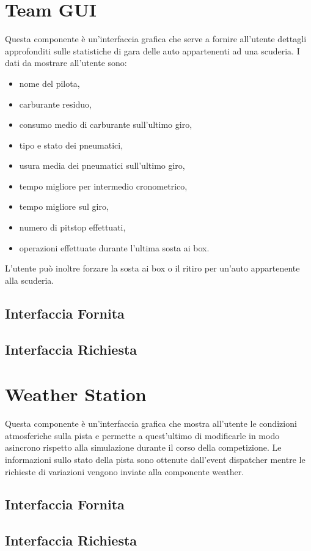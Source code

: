 \documentclass[11pt,a4paper]{report}
\begin{document}
\section{Team GUI}
Questa componente è un'interfaccia grafica che serve a fornire all'utente dettagli approfonditi sulle statistiche di gara delle auto appartenenti ad una scuderia.
I dati da mostrare all'utente sono:
\begin{itemize}
\item nome del pilota,
\item carburante residuo,
\item consumo medio di carburante sull'ultimo giro,
\item tipo e stato dei pneumatici,
\item usura media dei pneumatici sull'ultimo giro,
\item tempo migliore per intermedio cronometrico,
\item tempo migliore sul giro,
\item numero di pitstop effettuati,
\item operazioni effettuate durante l'ultima sosta ai box.
\end{itemize}
L'utente può inoltre forzare la sosta ai box o il ritiro per un'auto appartenente alla scuderia.
\subsection*{Interfaccia Fornita}
\subsection*{Interfaccia Richiesta}
\section{Weather Station}
Questa componente è un'interfaccia grafica che mostra all'utente le condizioni atmosferiche sulla pista e permette a quest'ultimo di modificarle in modo asincrono rispetto alla simulazione durante il corso della competizione. Le informazioni sullo stato della pista sono ottenute dall'event dispatcher mentre le richieste di variazioni vengono inviate alla componente weather.

\subsection*{Interfaccia Fornita}
\subsection*{Interfaccia Richiesta}
\end{document}
